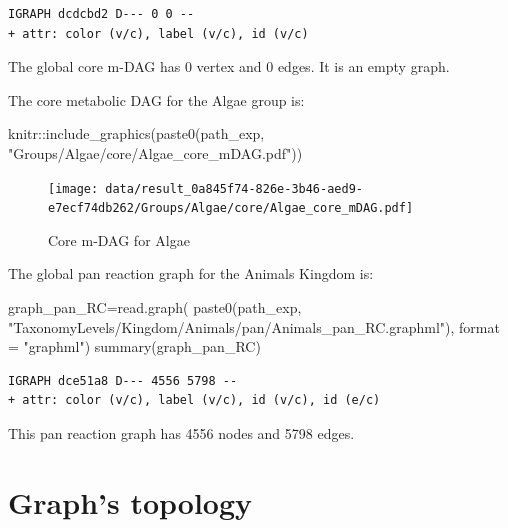 \documentclass[
  letterpaper,
  DIV=11,
  numbers=noendperiod]{scrreprt}
\newenvironment{Shaded}{}{}
\newcommand{\AttributeTok}[1]{\textcolor[rgb]{0.78,0.47,0.87}{#1}}
\newcommand{\FunctionTok}[1]{\textcolor[rgb]{0.38,0.69,0.94}{#1}}
\newcommand{\NormalTok}[1]{\textcolor[rgb]{0.67,0.70,0.75}{#1}}
\newcommand{\OtherTok}[1]{\textcolor[rgb]{0.15,0.68,0.38}{#1}}
\newcommand{\SpecialCharTok}[1]{\textcolor[rgb]{0.34,0.71,0.76}{#1}}
\newcommand{\StringTok}[1]{\textcolor[rgb]{0.60,0.76,0.47}{#1}}
\begin{document}
\begin{verbatim}
IGRAPH dcdcbd2 D--- 0 0 -- 
+ attr: color (v/c), label (v/c), id (v/c)
\end{verbatim}

The global core m-DAG has 0 vertex and 0 edges. It is an empty graph.

The core metabolic DAG for the Algae group is:

\begin{Shaded}
\begin{Highlighting}[]
\NormalTok{knitr}\SpecialCharTok{::}\FunctionTok{include\_graphics}\NormalTok{(}\FunctionTok{paste0}\NormalTok{(path\_exp,                              }\StringTok{"Groups/Algae/core/Algae\_core\_mDAG.pdf"}\NormalTok{))}
\end{Highlighting}
\end{Shaded}

\begin{figure}[H]

{\centering \texttt{[image: data/result\_0a845f74-826e-3b46-aed9-e7ecf74db262/Groups/Algae/core/Algae\_core\_mDAG.pdf]}

}

\caption{Core m-DAG for Algae}

\end{figure}

The global pan reaction graph for the Animals Kingdom is:

\begin{Shaded}
\begin{Highlighting}[]
\NormalTok{graph\_pan\_RC}\OtherTok{=}\FunctionTok{read.graph}\NormalTok{(}
  \FunctionTok{paste0}\NormalTok{(path\_exp,}
         \StringTok{"TaxonomyLevels/Kingdom/Animals/pan/Animals\_pan\_RC.graphml"}\NormalTok{),}
  \AttributeTok{format =} \StringTok{"graphml"}\NormalTok{)}
\FunctionTok{summary}\NormalTok{(graph\_pan\_RC)}
\end{Highlighting}
\end{Shaded}

\begin{verbatim}
IGRAPH dce51a8 D--- 4556 5798 -- 
+ attr: color (v/c), label (v/c), id (v/c), id (e/c)
\end{verbatim}

This pan reaction graph has 4556 nodes and 5798 edges.

\hypertarget{graphs-topology}{%
\section{Graph's topology}\label{graphs-topology}}
\end{document}
